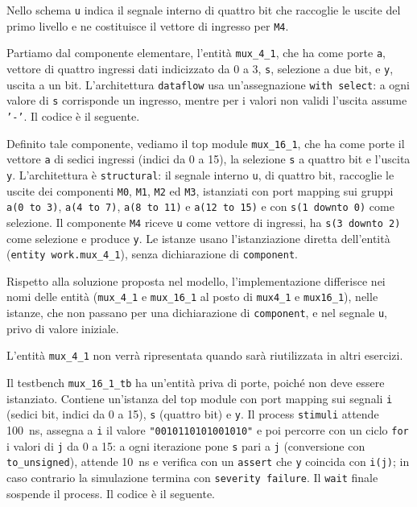 Nello schema \texttt{u} indica il segnale interno di quattro bit che raccoglie le uscite del primo livello e ne costituisce il vettore di ingresso per \texttt{M4}.

\implementazione

Partiamo dal componente elementare, l'entità \texttt{mux\_4\_1}, che ha come porte \texttt{a}, vettore di quattro ingressi dati indicizzato da 0 a 3, \texttt{s}, selezione a due bit, e \texttt{y}, uscita a un bit. L'architettura \texttt{dataflow} usa un'assegnazione \texttt{with select}: a ogni valore di \texttt{s} corrisponde un ingresso, mentre per i valori non validi l'uscita assume \texttt{'-'}. Il codice è il seguente.


Definito tale componente, vediamo il top module \texttt{mux\_16\_1}, che ha come porte il vettore \texttt{a} di sedici ingressi (indici da 0 a 15), la selezione \texttt{s} a quattro bit e l'uscita \texttt{y}. L'architettura è \texttt{structural}: il segnale interno \texttt{u}, di quattro bit, raccoglie le uscite dei componenti \texttt{M0}, \texttt{M1}, \texttt{M2} ed \texttt{M3}, istanziati con port mapping sui gruppi \texttt{a(0 to 3)}, \texttt{a(4 to 7)}, \texttt{a(8 to 11)} e \texttt{a(12 to 15)} e con \texttt{s(1 downto 0)} come selezione. Il componente \texttt{M4} riceve \texttt{u} come vettore di ingressi, ha \texttt{s(3 downto 2)} come selezione e produce \texttt{y}. Le istanze usano l'istanziazione diretta dell'entità (\texttt{entity work.mux\_4\_1}), senza dichiarazione di \texttt{component}.


Rispetto alla soluzione proposta nel modello, l'implementazione differisce nei nomi delle entità (\texttt{mux\_4\_1} e \texttt{mux\_16\_1} al posto di \texttt{mux4\_1} e \texttt{mux16\_1}), nelle istanze, che non passano per una dichiarazione di \texttt{component}, e nel segnale \texttt{u}, privo di valore iniziale.

L'entità \texttt{mux\_4\_1} non verrà ripresentata quando sarà riutilizzata in altri esercizi.

\simulazione

Il testbench \texttt{mux\_16\_1\_tb} ha un'entità priva di porte, poiché non deve essere istanziato. Contiene un'istanza del top module con port mapping sui segnali \texttt{i} (sedici bit, indici da 0 a 15), \texttt{s} (quattro bit) e \texttt{y}. Il process \texttt{stimuli} attende \SI{100}{ns}, assegna a \texttt{i} il valore \texttt{"0010110101001010"} e poi percorre con un ciclo \texttt{for} i valori di \texttt{j} da 0 a 15: a ogni iterazione pone \texttt{s} pari a \texttt{j} (conversione con \texttt{to\_unsigned}), attende \SI{10}{ns} e verifica con un \texttt{assert} che \texttt{y} coincida con \texttt{i(j)}; in caso contrario la simulazione termina con \texttt{severity failure}. Il \texttt{wait} finale sospende il process. Il codice è il seguente.

